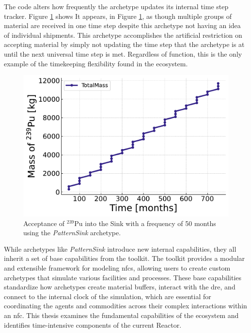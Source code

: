 
The code alters how frequently the archetype updates its internal time step tracker. Figure \ref{fig:pattern_freq_50} shows  It appears, in Figure \ref{fig:pattern_freq_50}, as though multiple groups of material are received in one time step despite this archetype not having an idea of individual shipments. This archetype accomplishes the artificial restriction on accepting material by simply not updating the time step that the archetype is at until the next universal time step is met. Regardless of function, this is the only example of the timekeeping flexibility found in the ecosystem.

\begin{figure}[H]
    \centering
    \includegraphics[scale=0.7]{images/cyclus/pattern_sink_fuel_transactions.pdf}
    \caption{Acceptance of $^{239}$Pu into the Sink with a frequency of 50 months using the \textit{PatternSink} archetype.}
    \label{fig:pattern_freq_50}
\end{figure}

While archetypes like \textit{PatternSink} introduce new internal capabilities, they all inherit a set of base capabilities from the \cyclus toolkit. The \cyclus toolkit provides a modular and extensible framework for modeling \glspl{nfc}, allowing users to create custom archetypes that simulate various facilities and processes. These base capabilities standardize how archetypes create material buffers, interact with the \gls{dre}, and connect to the internal clock of the simulation, which are essential for coordinating the agents and commodities across their complex interactions within an \gls{nfc}. This thesis examines the fundamental capabilities of the \cyclus ecosystem and identifies time-intensive components of the current \cycamore Reactor. %

